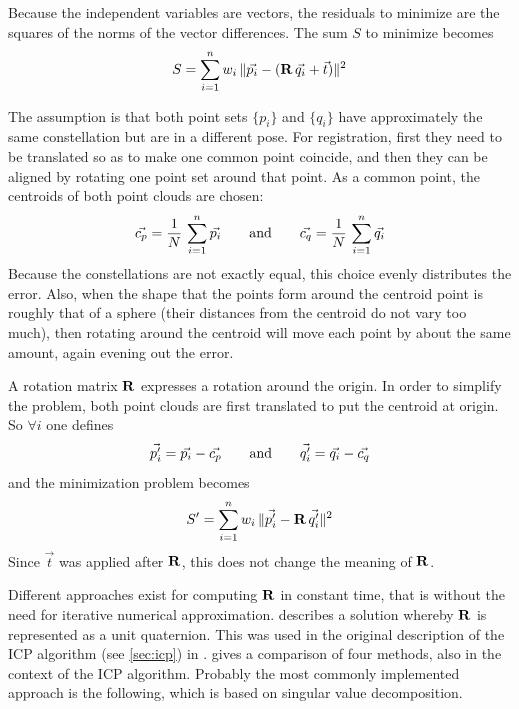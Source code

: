 Because the independent variables are vectors, the residuals to minimize are the squares of the norms of the vector differences. The sum $S$ to minimize becomes
\begin{equation}
S = \sum_{i=1}^{n} w_i \, \| \vec{p_i} - (\mathbf{R} \, \vec{q_i} + \vec{t}) \|^2
\end{equation}

The assumption is that both point sets $\{ p_i \}$ and $\{ q_i \}$ have approximately the same constellation but are in a different pose. For registration, first they need to be translated so as to make one common point coincide, and then they can be aligned by rotating one point set around that point. As a common point, the centroids of both point clouds are chosen:
\begin{equation}
\vec{c_p} = \frac{1}{N} \, \sum_{i=1}^{n} \vec{p_i}
\hspace{7mm} \text{and} \hspace{7mm}
\vec{c_q} = \frac{1}{N} \, \sum_{i=1}^{n} \vec{q_i}
\end{equation}
Because the constellations are not exactly equal, this choice evenly distributes the error. Also, when the shape that the points form around the centroid point is roughly that of a sphere (their distances from the centroid do not vary too much), then rotating around the centroid will move each point by about the same amount, again evening out the error. 

A rotation matrix $\mathbf{R}$ expresses a rotation around the origin. In order to simplify the problem, both point clouds are first translated to put the centroid at origin. So $\forall i$ one defines
\begin{equation}
\vec{p'_i} = \vec{p_i} - \vec{c_p}
\hspace{7mm} \text{and} \hspace{7mm}
\vec{q'_i} = \vec{q_i} - \vec{c_q}
\end{equation}
and the minimization problem becomes
\begin{equation} \label{eq:lsq_align_meaneds}
S' = \sum_{i=1}^{n} w_i \, \| \vec{p'_i} - \mathbf{R} \, \vec{q'_i} \|^2
\end{equation}
Since $\vec{t}$ was applied after $\mathbf{R}$, this does not change the meaning of $\mathbf{R}$.

Different approaches exist for computing $\mathbf{R}$ in constant time, that is without the need for iterative numerical approximation. \cite{Horn1986} describes a solution whereby $\mathbf{R}$ is represented as a unit quaternion. This was used in the original description of the ICP algorithm (see \ref{sec:icp}) in \cite{Besl1992}. \cite{Loru1995} gives a comparison of four methods, also in the context of the ICP algorithm. Probably the most commonly implemented approach is the following, which is based on singular value decomposition.

